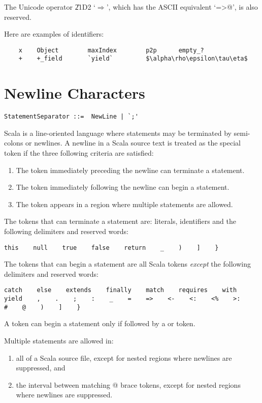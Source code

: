 The Unicode operator \U{21D2} `$\Rightarrow$', which has the ASCII equivalent
`\lstinline@=>@', is also reserved.

\example
Here are examples of identifiers:
\begin{lstlisting}
    x    Object        maxIndex        p2p      empty_?
    +    +_field       `yield`         $\alpha\rho\epsilon\tau\eta$      
\end{lstlisting}

\section{Newline Characters}\label{sec:newlines}

\syntax\begin{lstlisting}
StatementSeparator ::=  NewLine | `;'
\end{lstlisting}

Scala is a line-oriented language where statements may be terminated by
semi-colons or newlines. A newline in a Scala source text is treated
as the special \lstinline@NewLine@ token if the three following
criteria are satisfied:
\begin{enumerate}
\item
The token immediately preceding the newline can terminate a statement.
\item
The token immediately following the newline can begin a statement.
\item
The token appears in a region where multiple statements are allowed.
\end{enumerate}

The tokens that can terminate a statement are: literals, identifiers
and the following delimiters and reserved words:
\begin{lstlisting}
this    null    true    false    return    _    )    ]    }
\end{lstlisting}

The tokens that can begin a statement are all Scala tokens {\em except}
the following delimiters and reserved words:
\begin{lstlisting}
catch    else    extends    finally    match    requires    with    
yield    ,    .    ;    :    _    =    =>    <-    <:    <%    >:    
#    @    )    ]    }
\end{lstlisting}
A \lstinline@case@ token can begin a statement only if followed by a
\lstinline@class@ or \lstinline@object@ token.

Multiple statements are allowed in:
\begin{enumerate}
\item
all of a Scala source file, except for nested regions where newlines
are suppressed, and
\item
the interval between matching @ brace tokens,
except for nested regions where newlines are suppressed.
\end{enumerate}

